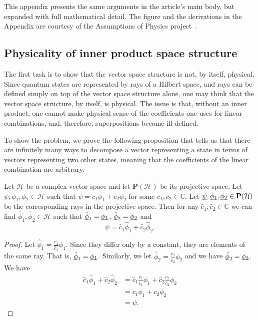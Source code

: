 \documentclass[10pt,twocolumn, nofootinbib]{revtex4-2}
\begin{document}
This appendix presents the same arguments in the article's main body, but expanded with full mathematical detail. The figure and the derivations in the Appendix are courtesy of the Assumptions of Physics project~\cite{aop-book}.

\subsection{Physicality of inner product space structure}

The first task is to show that the vector space structure is not, by itself, physical. Since quantum states are represented by rays of a Hilbert space, and rays can be defined simply on top of the vector space structure alone, one may think that the vector space structure, by itself, is physical. The issue is that, without an inner product, one cannot make physical sense of the coefficients one uses for linear combinations, and, therefore, superpositions become ill-defined.

To show the problem, we prove the following proposition that tells us that there are infinitely many ways to decompose a vector representing a state in terms of vectors representing two other states, meaning that the coefficients of the linear combination are arbitrary.
\begin{prop}\label{vector_insufficient} Let $\mathcal{H}$ be a complex vector space and let $\textbf{P}(\mathcal{H})$ be its projective space. Let $\psi, \phi_1, \phi_2 \in \mathcal{H}$ such that $\psi = c_1 \phi_1 + c_2 \phi_2$ for some $c_1, c_2 \in \mathbb{C}$. Let $\underbar{$\psi$}, \underbar{$\phi_1$}, \underbar{$\phi_2$} \in \textbf{P}(\mathcal{H})$ be the corresponding rays in the projective space. Then for any $\hat{c}_1, \hat{c}_2 \in \mathbb{C}$ we can find  $\hat{\phi}_1, \hat{\phi}_2 \in \mathcal{H}$ such that $\underbar{$\hat{\phi}$}_1 = \underbar{$\phi_1$}$, $\underbar{$\hat{\phi}$}_2 = \underbar{$\phi_2$}$ and
$$\psi = \hat{c}_1 \hat{\phi}_1 + \hat{c}_2 \hat{\phi}_2.$$
\end{prop}

\begin{proof}
Let $\hat{\phi}_1 = \frac{c_1}{\hat{c}_1} \phi_1$. Since they differ only by a constant, they are elements of the same ray. That is, $\underbar{$\hat{\phi}$}_1 = \underbar{$\phi_1$}$. Similarly, we let $\hat{\phi}_2 = \frac{c_2}{\hat{c}_2} \phi_2$ and we have $\underbar{$\hat{\phi}$}_2 = \underbar{$\phi_2$}$. We have
\begin{equation}
\begin{aligned}
\hat{c}_1 \hat{\phi}_1 + \hat{c}_2 \hat{\phi}_2 &= \hat{c}_1 \frac{c_1}{\hat{c}_1} \phi_1 + \hat{c}_2 \frac{c_2}{\hat{c}_2} \phi_2 \\
&= c_1 \phi_1 + c_2 \phi_2 \\
&= \psi.
\end{aligned}
\end{equation}
\end{proof}
\end{document}
